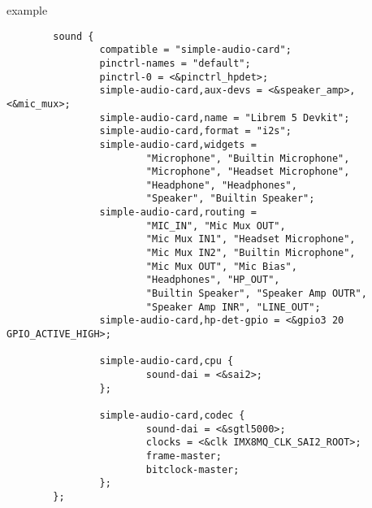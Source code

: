 \begin{frame}[fragile]{ example}
  \begin{block}{}
    \fontsize{7}{6}\selectfont
    \begin{verbatim}
        sound {
                compatible = "simple-audio-card";
                pinctrl-names = "default";
                pinctrl-0 = <&pinctrl_hpdet>;
                simple-audio-card,aux-devs = <&speaker_amp>, <&mic_mux>;
                simple-audio-card,name = "Librem 5 Devkit";
                simple-audio-card,format = "i2s";
                simple-audio-card,widgets =
                        "Microphone", "Builtin Microphone",
                        "Microphone", "Headset Microphone",
                        "Headphone", "Headphones",
                        "Speaker", "Builtin Speaker";
                simple-audio-card,routing =
                        "MIC_IN", "Mic Mux OUT",
                        "Mic Mux IN1", "Headset Microphone",
                        "Mic Mux IN2", "Builtin Microphone",
                        "Mic Mux OUT", "Mic Bias",
                        "Headphones", "HP_OUT",
                        "Builtin Speaker", "Speaker Amp OUTR",
                        "Speaker Amp INR", "LINE_OUT";
                simple-audio-card,hp-det-gpio = <&gpio3 20 GPIO_ACTIVE_HIGH>;

                simple-audio-card,cpu {
                        sound-dai = <&sai2>;
                };

                simple-audio-card,codec {
                        sound-dai = <&sgtl5000>;
                        clocks = <&clk IMX8MQ_CLK_SAI2_ROOT>;
                        frame-master;
                        bitclock-master;
                };
        };
    \end{verbatim}
  \end{block}
\end{frame}
